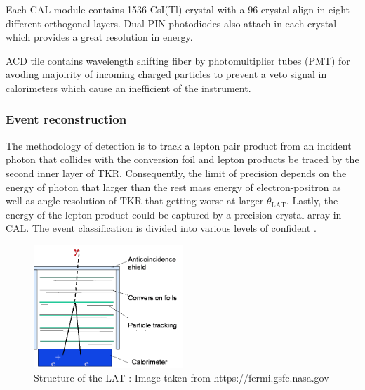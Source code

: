 \par Each CAL module contains 1536 CsI(Tl) crystal with a 96 crystal align in eight different orthogonal layers.
Dual PIN photodiodes also attach in each crystal which provides a great resolution in energy.

\par ACD tile contains wavelength shifting fiber by photomultiplier tubes (PMT) for avoding majoirity of incoming charged particles
to prevent a veto signal in calorimeters which cause an inefficient of the instrument. 

\subsubsection*{Event reconstruction}
The methodology of detection is to track a lepton pair product from an incident photon that collides with the conversion foil and lepton products be traced by the second inner layer of TKR.
Consequently, the limit of precision depends on the energy of photon that larger than the rest mass energy of electron-positron as well as angle resolution of TKR that getting worse at larger $\theta_\text{LAT}$.
Lastly, the energy of the lepton product could be captured by a precision crystal array in CAL. The event classification is divided into various levels of confident \cite{FermiDetail,Atwood:2013rka}.


\begin{figure}[h!]
  \centering
    \includegraphics[width=0.5\textwidth]{img/LATMethodology}
    \caption{Structure of the LAT : Image taken from https://fermi.gsfc.nasa.gov}
  \end{figure}
